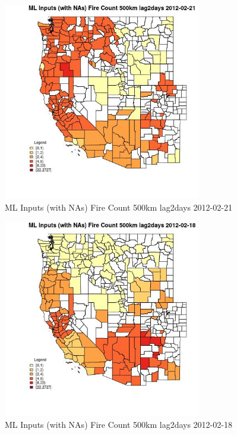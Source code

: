 \begin{figure} 
\centering  
\includegraphics[width=0.77\textwidth]{Code_Outputs/Report_ML_input_PM25_Step4_part_f_de_duplicated_aves_prioritize_24hr_obswNAs_CountyFire_Count_500km_lag2daysMean2012-02-21.jpg} 
\caption{\label{fig:Report_ML_input_PM25_Step4_part_f_de_duplicated_aves_prioritize_24hr_obswNAsCountyFire_Count_500km_lag2daysMean2012-02-21}ML Inputs (with NAs) Fire Count 500km lag2days 2012-02-21} 
\end{figure} 
 

\begin{figure} 
\centering  
\includegraphics[width=0.77\textwidth]{Code_Outputs/Report_ML_input_PM25_Step4_part_f_de_duplicated_aves_prioritize_24hr_obswNAs_CountyFire_Count_500km_lag2daysMean2012-02-18.jpg} 
\caption{\label{fig:Report_ML_input_PM25_Step4_part_f_de_duplicated_aves_prioritize_24hr_obswNAsCountyFire_Count_500km_lag2daysMean2012-02-18}ML Inputs (with NAs) Fire Count 500km lag2days 2012-02-18} 
\end{figure} 
 

